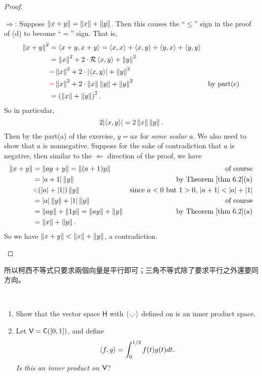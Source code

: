 \begin{proof}
\begin{enumerate}
\(\Longrightarrow\): Suppose \(\left\lVert x + y\right\rVert = \left\lVert x\right\rVert + \left\lVert y\right\rVert\).
Then this causes the ``\(\le\)'' sign in the proof of (d) to become ``\(=\)'' sign.
That is,
\begin{align*}
    \norm{x + y}^2 & = \LG x + y, x + y \RG = \LG x, x \RG + \LG x, y \RG + \LG y, x \RG + \LG y, y \RG \\
        & = \norm{x}^2 + 2 \cdot \mathcal{R}\LG x, y \RG + \norm{y}^2 \\
        & \RED{=} \norm{x}^2 + 2 \cdot \left| \LG x, y \RG \right| + \norm{y}^2 \\
        & \RED{=} \norm{x}^2 + 2 \cdot \norm{x} \norm{y} + \norm{y}^2 & \text{by part(c)} \\
        & = \left(\norm{x} + \norm{y}\right)^2.
\end{align*}
So in particular,
\[
    2 \lvert\left< x, y \right>\rvert = 2 \left\lVert x\right\rVert \left\lVert y\right\rVert.
\]
Then by the part(a) of the exercise, \(y = ax\) for \emph{some scalar} \(a\).
We also need to show that \(a\) is nonnegative.
Suppose for the sake of contradiction that \(a\) is negative, then similar to the \(\Longleftarrow\) direction of the proof, we have
\begin{align*}
    \norm{x + y} & = \norm{ay + y} = \norm{(a + 1)y} & \text{of course} \\
        & = \abs{a + 1}\norm{y} & \text{by \THM{6.2}(a)} \\
        & \RED{<} (\abs{a} + \abs{1})\norm{y} & \text{since \(a < 0\) but \(1 > 0\), \(\abs{a + 1} < \abs{a} + \abs{1}\)} \\
        & = \abs{a}\norm{y} + \abs{1}\norm{y} & \text{of course} \\
        & = \norm{ay} + \norm{1y} = \norm{ay} + \norm{y} & \text{by \THM{6.2}(a)} \\
        & = \norm{x} + \norm{y}.
\end{align*}
So we have \(\left\lVert x + y\right\rVert < \left\lVert x\right\rVert + \left\lVert y\right\rVert\), a contradiction.
\end{enumerate}
\end{proof}

\begin{note}
所以柯西不等式只要求兩個向量是平行即可；三角不等式除了要求平行之外還要同方向。
\end{note}

\begin{exercise} \label{exercise 6.1.16} \ 

\begin{enumerate}
\item Show that the vector space \(\textsf{H}\) with \(\left< \cdot, \cdot \right>\) defined on  is an inner product space.
\item Let \(\textsf{V} = \textsf{C}([0, 1])\), and define
\[
    \left< f, g \right> = \int_0^{1/2} f(t)g(t) dt.
\]
\emph{Is this an inner product on \(\textsf{V}\)}?
\end{enumerate}
\end{exercise}

